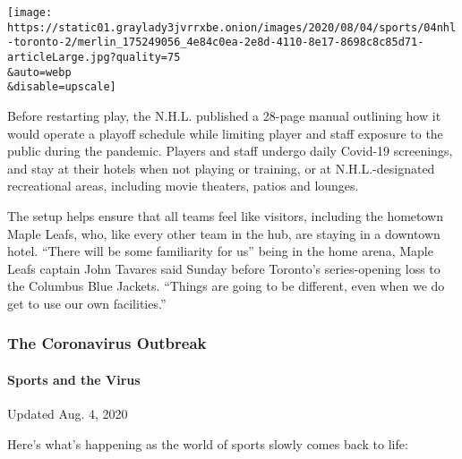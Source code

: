 \texttt{[image: https://static01.graylady3jvrrxbe.onion/images/2020/08/04/sports/04nhl-toronto-2/merlin\_175249056\_4e84c0ea-2e8d-4110-8e17-8698c8c85d71-articleLarge.jpg?quality=75\\\&auto=webp\\\&disable=upscale]}

Before restarting play, the N.H.L. published a 28-page manual outlining
how it would operate a playoff schedule while limiting player and staff
exposure to the public during the pandemic. Players and staff undergo
daily Covid-19 screenings, and stay at their hotels when not playing or
training, or at N.H.L.-designated recreational areas, including movie
theaters, patios and lounges.

The setup helps ensure that all teams feel like visitors, including the
hometown Maple Leafs, who, like every other team in the hub, are staying
in a downtown hotel. ``There will be some familiarity for us'' being in
the home arena, Maple Leafs captain John Tavares said Sunday before
Toronto's series-opening loss to the Columbus Blue Jackets. ``Things are
going to be different, even when we do get to use our own facilities.''

\hypertarget{the-coronavirus-outbreak}{%
\subsubsection{The Coronavirus
Outbreak}\label{the-coronavirus-outbreak}}

\hypertarget{sports-and-the-virus}{%
\paragraph{Sports and the Virus}\label{sports-and-the-virus}}

Updated Aug. 4, 2020

Here's what's happening as the world of sports slowly comes back to
life:

